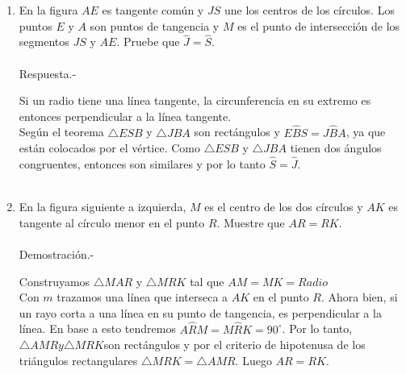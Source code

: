 \documentclass[10pt]{article}
\begin{document}
\begin{enumerate}
\begin{enumerate}[\bfseries a)]
    \end{enumerate}


\item En la figura $AE$ es tangente común y $JS$ une los centros de los círculos. Los puntos $E$ y $A$ son puntos de tangencia y $M$ es el punto de intersección de los segmentos $JS$ y $AE$. Pruebe que $\widehat{J} = \widehat{S}.$\\\\
    Respuesta.-\; 
    \begin{center}
    \end{center}
    Si un radio tiene una línea tangente, la circunferencia en su extremo es entonces perpendicular a la línea tangente.\\
    Según el teorema $\triangle ESB$ y $\triangle JBA$ son rectángulos y $E\widehat{B}S = J\widehat{B}A$, ya que están colocados por el vértice. Como $\triangle ESB$ y $\triangle JBA$ tienen dos ángulos congruentes, entonces son similares y por lo tanto $\widehat{S} = \widehat{J}$.\\\\

\item En la figura siguiente a izquierda, $M$ es el centro de los dos círculos y $AK$ es tangente al círculo menor en el punto $R$. Muestre que $AR = RK$.\\\\
    Demostración.-\;
    \begin{center}
    \end{center}
    Construyamos $\triangle MAR$ y $\triangle MRK$ tal que $AM=MK=Radio$\\
    Con $m$ trazamos una línea que interseca a $AK$ en el punto $R$. Ahora bien, si un rayo corta a una línea en su punto de tangencia, es perpendicular a la línea. En base a esto tendremos $A\widehat{R}M = M\widehat{R}K = 90^{\circ}$. Por lo tanto, $\triangle AMR y \triangle MRK$son rectángulos y por el criterio de hipotenusa de los triángulos rectangulares $\triangle MRK = \triangle AMR$. Luego $AR = RK$.\\\\


\end{enumerate}
\end{document}
